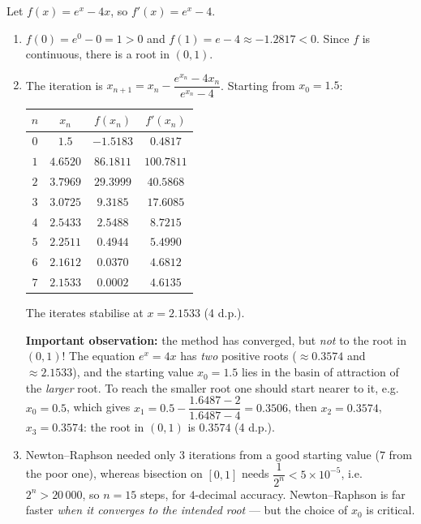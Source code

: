 \documentclass[11pt]{article}
\begin{document}
\begin{corrige}
Let $f(x) = e^{x} - 4x$, so $f'(x) = e^{x} - 4$.
\begin{enumerate}
\item $f(0) = e^{0} - 0 = 1 > 0$ and $f(1) = e - 4 \approx -1.2817 < 0$. Since $f$ is continuous, there is a root in $(0, 1)$.
\item The iteration is $x_{n+1} = x_{n} - \dfrac{e^{x_{n}} - 4x_{n}}{e^{x_{n}} - 4}$. Starting from $x_{0} = 1.5$:
\begin{center}
\begin{tabular}{|c|c|c|c|}
\hline
\rowcolor{popblueL} $n$ & $x_{n}$ & $f(x_{n})$ & $f'(x_{n})$ \\
\hline
$0$ & $1.5$ & $-1.5183$ & $0.4817$ \\
$1$ & $4.6520$ & $86.1811$ & $100.7811$ \\
$2$ & $3.7969$ & $29.3999$ & $40.5868$ \\
$3$ & $3.0725$ & $9.3185$ & $17.6085$ \\
$4$ & $2.5433$ & $2.5488$ & $8.7215$ \\
$5$ & $2.2511$ & $0.4944$ & $5.4990$ \\
$6$ & $2.1612$ & $0.0370$ & $4.6812$ \\
$7$ & $2.1533$ & $0.0002$ & $4.6135$ \\
\hline
\end{tabular}
\end{center}
The iterates stabilise at $x = 2.1533$ (4 d.p.).

\textbf{Important observation:} the method has converged, but \emph{not} to the root in $(0,1)$! The equation $e^{x} = 4x$ has \emph{two} positive roots ($\approx 0.3574$ and $\approx 2.1533$), and the starting value $x_{0} = 1.5$ lies in the basin of attraction of the \emph{larger} root. To reach the smaller root one should start nearer to it, e.g. $x_{0} = 0.5$, which gives $x_{1} = 0.5 - \dfrac{1.6487 - 2}{1.6487 - 4} = 0.3506$, then $x_{2} = 0.3574$, $x_{3} = 0.3574$: the root in $(0,1)$ is $0.3574$ (4 d.p.).
\item Newton--Raphson needed only $3$ iterations from a good starting value ($7$ from the poor one), whereas bisection on $[0,1]$ needs $\dfrac{1}{2^{n}} < 5\times 10^{-5}$, i.e. $2^{n} > 20\,000$, so $n = 15$ steps, for $4$-decimal accuracy. Newton--Raphson is far faster \emph{when it converges to the intended root} — but the choice of $x_{0}$ is critical.
\end{enumerate}
\end{corrige}
\end{document}
